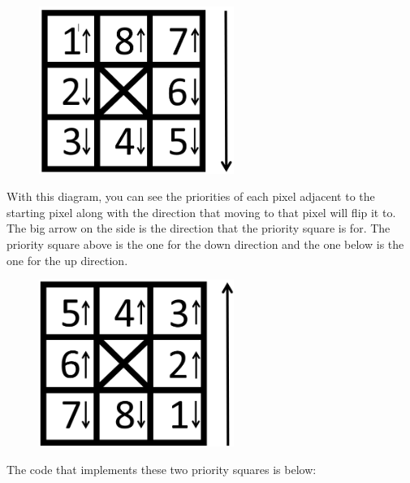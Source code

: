 \documentclass{report}
\begin{document}
\begin{figure}[H]
    \centering
    \includegraphics[width = 2.5in]{Images/Development and Testing/Stage 5/Good Priority Squares/Priority Square With Directions - Down.png}
    \label{fig:Priority Square With Directions - Down.png}
\end{figure}
\noindent With this diagram, you can see the priorities of each pixel adjacent to the starting pixel along with the direction that moving to that pixel will flip it to. The big arrow on the side is the direction that the priority square is for. The priority square above is the one for the down direction and the one below is the one for the up direction.
\begin{figure}[H]
    \centering
    \includegraphics[width = 2.5in]{Images/Development and Testing/Stage 5/Good Priority Squares/Priority Square With Directions - Up.png}
    \label{fig:Priority Square With Directions - Up}
\end{figure}
\noindent The code that implements these two priority squares is below:
\end{document}
